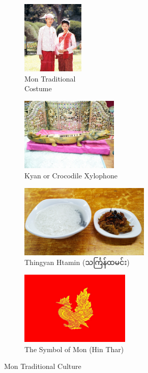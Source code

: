 \documentclass[conference]{IEEEtran}
\begin{document}
\begin{figure}[h!]
  \centering
  \begin{subfigure}[b]{0.4\linewidth}
    \includegraphics[width=\linewidth, height=3.5cm]{./fig/mon.jpg}
    \caption{Mon Traditional \\Costume}
  \end{subfigure}
  \begin{subfigure}[b]{0.4\linewidth}
    \includegraphics[width=\linewidth, height=3.5cm]{./fig/saung.jpg}
    \caption{Kyan or Crocodile Xylophone}
  \end{subfigure}
  \begin{subfigure}[b]{0.4\linewidth}
    \includegraphics[width=\linewidth, height=3.5cm]{./fig/thingyan.jpg}
    \caption{Thingyan Htamin ({\padauktext သင်္ကြန်ထမင်း})}
  \end{subfigure}
  \begin{subfigure}[b]{0.4\linewidth}
    \includegraphics[width=\linewidth, height=3.5cm]{./fig/hinthar.jpg}
    \caption{The Symbol of Mon (Hin Thar)}
  \end{subfigure}
  \caption{Mon Traditional Culture}
  \label{fig:coffee}
\end{figure}
\end{document}
